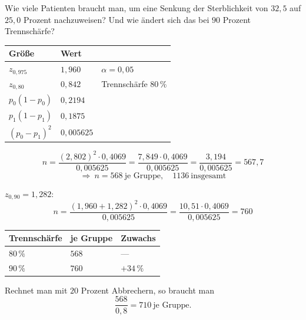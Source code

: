 \begin{aufgabe}
Wie viele Patienten braucht man, um eine Senkung der Sterblichkeit von $32{,}5$ auf $25{,}0$ Prozent nachzuweisen? Und wie ändert sich das bei $90$ Prozent Trennschärfe?

\loesung
{}
\begin{center}
{\small
\renewcommand{\arraystretch}{1.48}
\begin{tabular}{@{}P{2.6cm}P{2.4cm}P{2.4cm}@{}}
\toprule
\textbf{Größe} & \textbf{Wert} & \\
\midrule
$z_{0{,}975}$ & $1{,}960$ & $\alpha = 0{,}05$\\
$z_{0{,}80}$ & $0{,}842$ & Trennschärfe $80\,\%$\\
$p_0(1-p_0)$ & $0{,}2194$ & \\
$p_1(1-p_1)$ & $0{,}1875$ & \\
$(p_0-p_1)^{2}$ & $0{,}005625$ & \\
\bottomrule
\end{tabular}}
\end{center}

\[ n = \frac{(2{,}802)^{2}\cdot0{,}4069}{0{,}005625} = \frac{7{,}849\cdot0{,}4069}{0{,}005625} = \frac{3{,}194}{0{,}005625} = 567{,}7 \]
\[ \Longrightarrow\ n = 568 \ \text{je Gruppe}, \quad 1136 \ \text{insgesamt} \]

$z_{0{,}90} = 1{,}282$:
\[ n = \frac{(1{,}960+1{,}282)^{2}\cdot0{,}4069}{0{,}005625} = \frac{10{,}51\cdot0{,}4069}{0{,}005625} = 760 \]

\begin{center}
{\small
\renewcommand{\arraystretch}{1.48}
\begin{tabular}{@{}P{2.6cm}P{2.2cm}P{2.2cm}@{}}
\toprule
\textbf{Trennschärfe} & \textbf{je Gruppe} & \textbf{Zuwachs}\\
\midrule
$80\,\%$ & $568$ & --- \\
$90\,\%$ & $760$ & $+34\,\%$\\
\bottomrule
\end{tabular}}
\end{center}

Rechnet man mit $20$ Prozent Abbrechern, so braucht man
\[ \frac{568}{0{,}8} = 710 \ \text{je Gruppe.} \]

\begin{center}
\begin{minipage}{0.88\textwidth}
\end{minipage}
\end{center}
\end{aufgabe}

